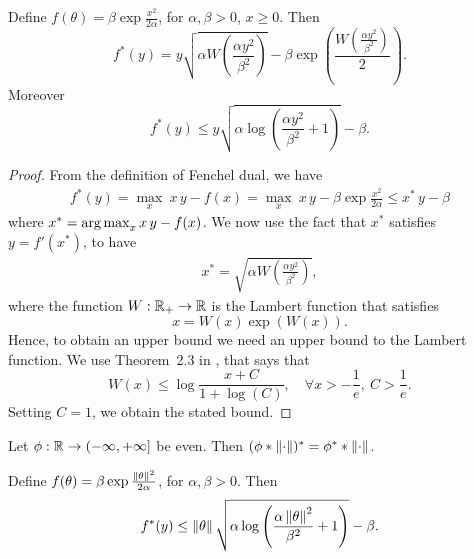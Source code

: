 \begin{lemma}
Define $f(\theta)= \beta \exp\frac{x^2}{2 \alpha}$, for $\alpha,\beta>0$, $x\geq0$. Then
\[
f^*(y)=y \sqrt{\alpha W\left(\frac{\alpha y^2}{\beta^2}\right)} - \beta \exp\left(\frac{W\left(\frac{\alpha y^2}{\beta^2}\right)}{2}\right).
\]
Moreover
\[
f^*(y) \leq y \sqrt{\alpha \log \left(\frac{\alpha y^2}{\beta^2} +1 \right)} - \beta.
\]
\end{lemma}
\begin{proof}
From the definition of Fenchel dual, we have
\begin{align*}
f^*(y)= \max_{x} \  x\, y - f(x) = \max_{x} \  x\, y - \beta \exp\frac{x^2}{2 \alpha} \leq x^*\,y -\beta
\end{align*}
where $x^*= \operatorname*{arg\,max}_{x} x\, y - f(x)$. We now use the fact that $x^*$ satisfies $y = f'(x^*)$, to have
\begin{align*}
x^*=\sqrt{\alpha W\left(\frac{\alpha y^2}{\beta^2}\right)},
\end{align*}
where the function $W:\mathbb{R}_+ \rightarrow \mathbb{R}$ is the Lambert function that satisfies
\[
x=W(x) \exp \left(W(x)\right).
\]
Hence, to obtain an upper bound we need an upper bound to the Lambert function.
We use Theorem~2.3 in \cite{hoorfar2008inequalities}, that says that
\[
W(x) \leq \log\frac{x+C}{1+\log(C)}, \quad \forall x> -\frac{1}{e}, \ C>\frac{1}{e}.
\]
Setting $C=1$, we obtain the stated bound.
\end{proof}

\begin{lemma}
Let $\phi:\mathbb{R} \rightarrow (-\infty, +\infty]$ be even. Then $(\phi \ast \left\|{\cdot}\right\|)^*=\phi^* \ast \left\|{\cdot}\right\|$.
\end{lemma}

\begin{cor}
\label{cor:dual_exp_square}
Define $f(\theta)= \beta \exp\frac{\left\|{\theta}\right\|^2}{2 \alpha}$, for $\alpha,\beta>0$. Then
\[
f^*(y) \leq  \left\|{\theta}\right\| \sqrt{\alpha \log \left(\frac{\alpha \left\|{\theta}\right\|^2}{\beta^2} +1 \right)} - \beta.
\]
\end{cor}


